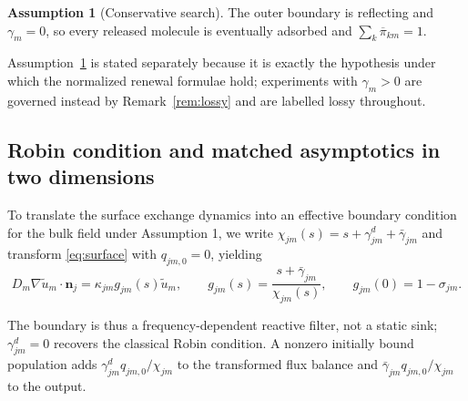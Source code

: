 \documentclass[pdflatex,sn-mathphys-num]{sn-jnl}
\numberwithin{equation}{section}
\theoremstyle{thmstyleone}%
\theoremstyle{definition}
\newtheorem{assumption}[theorem]{Assumption}
\theoremstyle{remark}
\begin{document}
\begin{assumption}[Conservative search]\label{ass:cons}
The outer boundary is reflecting and $\gamma_m=0$, so every released molecule is eventually adsorbed and $\sum_k\overline\pi_{km}=1$.
\end{assumption}

Assumption~\ref{ass:cons} is stated separately because it is exactly the hypothesis under which the normalized renewal formulae hold; experiments with $\gamma_m>0$ are governed instead by Remark~\ref{rem:lossy} and are
labelled lossy throughout.

\subsection{Robin condition and matched asymptotics in two dimensions}

To translate the surface exchange dynamics into an effective boundary condition for the bulk field under Assumption 1, we write $\chi_{jm}(s)=s+\gamma^d_{jm}+\bar\gamma_{jm}$ and transform \eqref{eq:surface} with $q_{jm,0}=0$, yielding
\begin{equation}
D_m\nabla\widetilde u_m\cdot\mathbf n_j=\kappa_{jm}g_{jm}(s)\widetilde u_m,
\qquad
g_{jm}(s)=\frac{s+\bar\gamma_{jm}}{\chi_{jm}(s)},\qquad
g_{jm}(0)=1-\sigma_{jm}.
\label{eq:grobin}
\end{equation}

The boundary is thus a frequency-dependent reactive filter, not a static sink; $\gamma^d_{jm}=0$ recovers the classical Robin condition. A nonzero initially bound population adds $ \gamma^d_{jm}q_{jm,0}/\chi_{jm}$ to the transformed flux balance and $\bar\gamma_{jm}q_{jm,0}/\chi_{jm}$ to the output.
\end{document}
